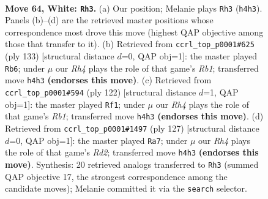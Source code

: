 \documentclass[11pt]{article}
\begin{document}
\clearpage

\begin{figure}[p]\centering
\begin{subfigure}{0.46\textwidth}\centering
\resizebox{\linewidth}{!}{%
\newchessgame
\chessboard[
  setfen={6k1/8/2r5/8/7R/8/8/6K1 w - - 8 64},
  showmover=false,
  pgfstyle=straightmove, color=movearrow, markmove={h4-h3}
]}
\caption{}
\end{subfigure}\hfill
\begin{subfigure}{0.46\textwidth}\centering
\resizebox{\linewidth}{!}{%
\newchessgame
\chessboard[
  setfen={1r6/3k4/8/8/8/8/6R1/2K5 b - - 35 67},
  showmover=false,
  pgfstyle=straightmove, color=movearrow, markmove={b8-b6}
]}
\caption{}
\end{subfigure}
\\[4pt]
\begin{subfigure}{0.46\textwidth}\centering
\resizebox{\linewidth}{!}{%
\newchessgame
\chessboard[
  setfen={2k5/8/4K3/r7/8/8/8/1R6 w - - 4 62},
  showmover=false,
  pgfstyle=straightmove, color=movearrow, markmove={b1-f1}
]}
\caption{}
\end{subfigure}\hfill
\begin{subfigure}{0.46\textwidth}\centering
\resizebox{\linewidth}{!}{%
\newchessgame
\chessboard[
  setfen={1R6/3r4/8/8/6k1/8/8/4K3 b - - 8 64},
  showmover=false,
  pgfstyle=straightmove, color=movearrow, markmove={d7-a7}
]}
\caption{}
\end{subfigure}
\caption{\textbf{Move 64, White: \texttt{Rh3}.} (a) Our position; Melanie plays \texttt{Rh3} (\texttt{h4h3}). Panels (b)--(d) are the retrieved master positions whose correspondence most drove this move (highest QAP objective among those that transfer to it). (b) Retrieved from \texttt{ccrl\_top\_p0001\#625} (ply 133) [structural distance $d$=0, QAP obj=1]: the master played \texttt{Rb6}; under $\mu$ our \emph{Rh4} plays the role of that game's \emph{Rb1}; transferred move \texttt{h4h3} \textbf{(endorses this move)}. (c) Retrieved from \texttt{ccrl\_top\_p0001\#594} (ply 122) [structural distance $d$=1, QAP obj=1]: the master played \texttt{Rf1}; under $\mu$ our \emph{Rh4} plays the role of that game's \emph{Rb1}; transferred move \texttt{h4h3} \textbf{(endorses this move)}. (d) Retrieved from \texttt{ccrl\_top\_p0001\#1497} (ply 127) [structural distance $d$=0, QAP obj=1]: the master played \texttt{Ra7}; under $\mu$ our \emph{Rh4} plays the role of that game's \emph{Rd2}; transferred move \texttt{h4h3} \textbf{(endorses this move)}. Synthesis: 20 retrieved analogs transferred to \texttt{Rh3} (summed QAP objective 17, the strongest correspondence among the candidate moves); Melanie committed it via the \texttt{search} selector.}
\label{fig:thought-m126}
\end{figure}
\end{document}
